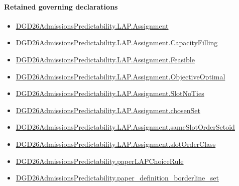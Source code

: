 \documentclass[10pt]{article}
\begin{document}
\paragraph{Retained governing declarations}
\begin{itemize}\raggedright
\item \hyperlink{governing-declaration-a9620f375b9ffc53}{DGD26\allowbreak{}Admissions\allowbreak{}Predictability.\allowbreak{}LAP.\allowbreak{}Assignment}
\item \hyperlink{governing-declaration-2fdf10e01c6dcf10}{DGD26\allowbreak{}Admissions\allowbreak{}Predictability.\allowbreak{}LAP.\allowbreak{}Assignment.\allowbreak{}Capacity\allowbreak{}Filling}
\item \hyperlink{governing-declaration-558d825b74162606}{DGD26\allowbreak{}Admissions\allowbreak{}Predictability.\allowbreak{}LAP.\allowbreak{}Assignment.\allowbreak{}Feasible}
\item \hyperlink{governing-declaration-d0742fed343f82c8}{DGD26\allowbreak{}Admissions\allowbreak{}Predictability.\allowbreak{}LAP.\allowbreak{}Assignment.\allowbreak{}Objective\allowbreak{}Optimal}
\item \hyperlink{governing-declaration-9ad3d98d760488d4}{DGD26\allowbreak{}Admissions\allowbreak{}Predictability.\allowbreak{}LAP.\allowbreak{}Assignment.\allowbreak{}Slot\allowbreak{}No\allowbreak{}Ties}
\item \hyperlink{governing-declaration-dd23aabf9cea408a}{DGD26\allowbreak{}Admissions\allowbreak{}Predictability.\allowbreak{}LAP.\allowbreak{}Assignment.\allowbreak{}chosen\allowbreak{}Set}
\item \hyperlink{governing-declaration-f0b42427ac7fad74}{DGD26\allowbreak{}Admissions\allowbreak{}Predictability.\allowbreak{}LAP.\allowbreak{}Assignment.\allowbreak{}same\allowbreak{}Slot\allowbreak{}Order\allowbreak{}Setoid}
\item \hyperlink{governing-declaration-557b03c4632edcf3}{DGD26\allowbreak{}Admissions\allowbreak{}Predictability.\allowbreak{}LAP.\allowbreak{}Assignment.\allowbreak{}slot\allowbreak{}Order\allowbreak{}Class}
\item \hyperlink{governing-declaration-d295c7bae8307e45}{DGD26\allowbreak{}Admissions\allowbreak{}Predictability.\allowbreak{}paper\allowbreak{}LAP\allowbreak{}Choice\allowbreak{}Rule}
\item \hyperlink{governing-declaration-6c36470804ab6581}{DGD26\allowbreak{}Admissions\allowbreak{}Predictability.\allowbreak{}paper\_\allowbreak{}definition\_\allowbreak{}borderline\_\allowbreak{}set}
\end{itemize}
\end{document}
